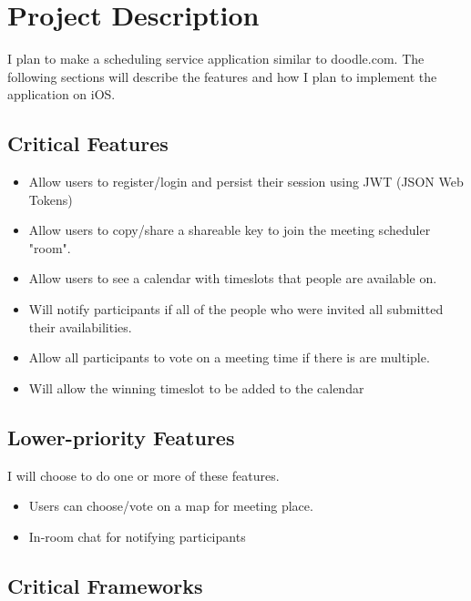 \documentclass[11pt]{article}
\author{Andrew Chen}
\date{\today}
\title{}
\begin{document}
\tableofcontents

\section{Project Description}
\label{sec:org52c672e}

I plan to make a scheduling service application similar to doodle.com. The following sections will
describe the features and how I plan to implement the application on iOS.

\subsection{Critical Features}
\label{sec:org447b377}

\begin{itemize}
\item Allow users to register/login and persist their session using JWT (JSON Web Tokens)
\item Allow users to copy/share a shareable key to join the meeting scheduler "room".
\item Allow users to see a calendar with timeslots that people are available on.
\item Will notify participants if all of the people who were invited all submitted their availabilities.
\item Allow all participants to vote on a meeting time if there is are multiple.
\item Will allow the winning timeslot to be added to the calendar
\end{itemize}

\subsection{Lower-priority Features}
\label{sec:org0645118}

I will choose to do one or more of these features.

\begin{itemize}
\item Users can choose/vote on a map for meeting place.
\item In-room chat for notifying participants
\end{itemize}

\subsection{Critical Frameworks}
\label{sec:org6e1c444}
\end{document}
